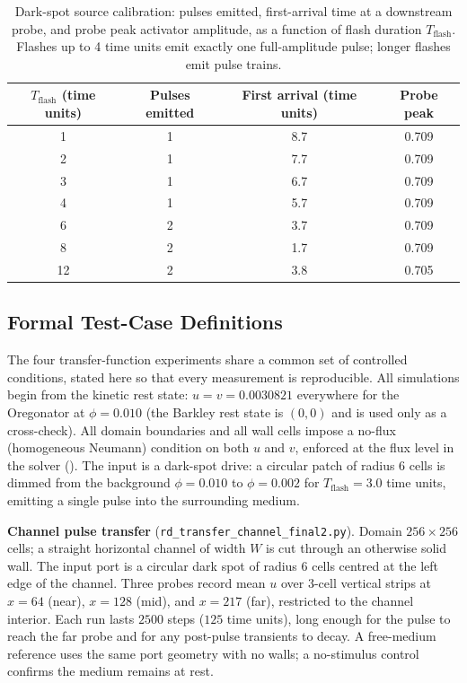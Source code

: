 \begin{table}[htbp]
\centering
\caption{Dark-spot source calibration: pulses emitted, first-arrival time at a downstream probe, and probe peak activator amplitude, as a function of flash duration $T_{\mathrm{flash}}$. Flashes up to 4 time units emit exactly one full-amplitude pulse; longer flashes emit pulse trains.}
\label{tab:meth_flash_calib}
\begin{tabular}{cccc}
\toprule
$T_{\mathrm{flash}}$ (time units) & Pulses emitted & First arrival (time units) & Probe peak \\
\midrule
1 & 1 & 8.7 & 0.709 \\
2 & 1 & 7.7 & 0.709 \\
3 & 1 & 6.7 & 0.709 \\
4 & 1 & 5.7 & 0.709 \\
6 & 2 & 3.7 & 0.709 \\
8 & 2 & 1.7 & 0.709 \\
12 & 2 & 3.8 & 0.705 \\
\bottomrule
\end{tabular}
\end{table}

\subsection{Formal Test-Case Definitions}
\label{sec:meth_testcases}

The four transfer-function experiments share a common set of controlled conditions, stated here so that every measurement is reproducible.
All simulations begin from the kinetic rest state: $u = v = 0.0030821$ everywhere for the Oregonator at $\phi = 0.010$ (the Barkley rest state is $(0,0)$ and is used only as a cross-check).
All domain boundaries and all wall cells impose a no-flux (homogeneous Neumann) condition on both $u$ and $v$, enforced at the flux level in the solver ().
The input is a dark-spot drive: a circular patch of radius 6 cells is dimmed from the background $\phi = 0.010$ to $\phi = 0.002$ for $T_{\mathrm{flash}} = 3.0$ time units, emitting a single pulse into the surrounding medium.

\textbf{Channel pulse transfer} (\texttt{rd\_transfer\_channel\_final2.py}).
Domain $256 \times 256$ cells; a straight horizontal channel of width $W$ is cut through an otherwise solid wall.
The input port is a circular dark spot of radius 6 cells centred at the left edge of the channel.
Three probes record mean $u$ over 3-cell vertical strips at $x = 64$ (near), $x = 128$ (mid), and $x = 217$ (far), restricted to the channel interior.
Each run lasts $2500$ steps ($125$ time units), long enough for the pulse to reach the far probe and for any post-pulse transients to decay.
A free-medium reference uses the same port geometry with no walls; a no-stimulus control confirms the medium remains at rest.


